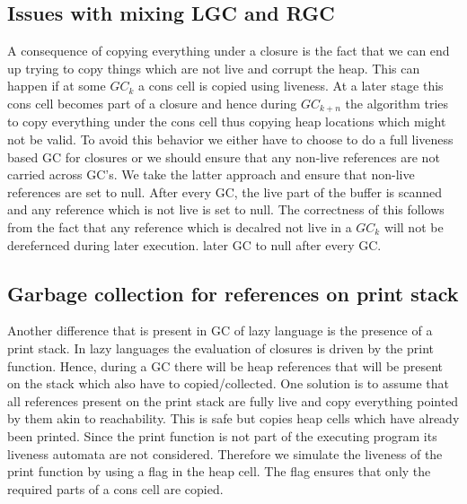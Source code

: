 \documentclass[9pt]{sigplanconf}
\newcommand{\comment}[1]{{\color{Myblue}{(#1)}}}
\newcommand{\cred}[1]{{\color{red}{#1}}}
\begin{document}
\subsection{Issues with mixing LGC and RGC}
A consequence of  copying everything under a closure  is the fact that
we can end up trying to copy things which are not live and corrupt the
heap. This  can happen if at some  $GC_k$ a cons cell  is copied using
liveness. At  a later stage this  cons cell becomes part  of a closure
and  hence during $GC_{k+n}$  the algorithm  tries to  copy everything
under the  cons cell  thus copying heap  locations which might  not be
valid.  To avoid  this behavior we either have to choose  to do a full
liveness based  GC for closures or  we should ensure  that any non-live
references are  not carried across  GC's. We take the  latter approach
and ensure that  non-live references are set to  null. After every GC,
the live part of the buffer  is scanned and any reference which is not
live is  set to null.  The correctness of  this follows from  the fact
that any reference which is decalred  not live in a $GC_k$ will not be
derefernced during later execution.
later GC
to null after every GC.
\subsection{Garbage collection for references on print stack}
Another  difference that is  present in  GC of  lazy language  is the
presence  of  a print  stack.  In  lazy  languages the  evaluation  of
closures is  driven by the print  function\comment{Refer to SPJ's
book}.  Hence, during  a GC there
will be heap  references that will be present on  the stack which also
have  to  copied/collected.   One  solution  is  to  assume  that  all
references  present  on  the  print  stack are  fully  live  and  copy
everything pointed  by them  akin to reachability.   This is  safe but
copies heap  cells which  have already been  printed. Since  the print
function is  not part of  the executing program its  liveness automata
are not  considered. Therefore we  simulate the liveness of  the print
function by using a flag in  the heap cell. The flag ensures that only
the required parts  of a cons cell are copied.\cred{Very sketchy: Make
  another attempt to write}

\end{document}
